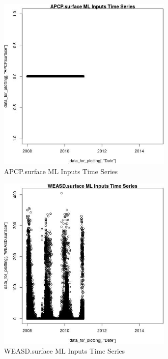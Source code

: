 \begin{figure} 
\centering  
\includegraphics[width=0.77\textwidth]{Code_Outputs/ML_input_report_ML_input_PM25_Step5_part_d_de_duplicated_aves_ML_input_APCP.surfaceTS.jpg} 
\caption{\label{fig:ML_input_report_ML_input_PM25_Step5_part_d_de_duplicated_aves_ML_inputAPCP.surfaceTS}APCP.surface ML Inputs Time Series} 
\end{figure} 
 

\begin{figure} 
\centering  
\includegraphics[width=0.77\textwidth]{Code_Outputs/ML_input_report_ML_input_PM25_Step5_part_d_de_duplicated_aves_ML_input_WEASD.surfaceTS.jpg} 
\caption{\label{fig:ML_input_report_ML_input_PM25_Step5_part_d_de_duplicated_aves_ML_inputWEASD.surfaceTS}WEASD.surface ML Inputs Time Series} 
\end{figure} 
 

